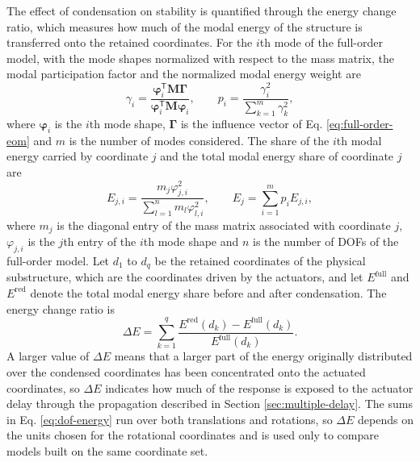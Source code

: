 \documentclass[11pt,a4paper]{article}
\numberwithin{equation}{section}
\begin{document}
The effect of condensation on stability is quantified through the energy change ratio, which measures how much of the modal energy of the structure is transferred onto the retained coordinates. For the \(i\)th mode of the full-order model, with the mode shapes normalized with respect to the mass matrix, the modal participation factor and the normalized modal energy weight are
\begin{equation}
	\gamma_{i}=
	\frac{\bm{\varphi}_{i}^{\mathsf{T}}\mathbf{M}\bm{\Gamma}}
	{\bm{\varphi}_{i}^{\mathsf{T}}\mathbf{M}\bm{\varphi}_{i}},
	\qquad
	p_{i}=\frac{\gamma_{i}^{2}}{\displaystyle\sum_{k=1}^{m}\gamma_{k}^{2}},
	\label{eq:modal-weight}
\end{equation}
where \(\bm{\varphi}_{i}\) is the \(i\)th mode shape, \(\bm{\Gamma}\) is the influence vector of Eq. \eqref{eq:full-order-eom} and \(m\) is the number of modes considered. The share of the \(i\)th modal energy carried by coordinate \(j\) and the total modal energy share of coordinate \(j\) are
\begin{equation}
	E_{j,i}=
	\frac{m_{j}\varphi_{j,i}^{2}}{\displaystyle\sum_{l=1}^{n}m_{l}\varphi_{l,i}^{2}},
	\qquad
	E_{j}=\sum_{i=1}^{m}p_{i}E_{j,i},
	\label{eq:dof-energy}
\end{equation}
where \(m_{j}\) is the diagonal entry of the mass matrix associated with coordinate \(j\), \(\varphi_{j,i}\) is the \(j\)th entry of the \(i\)th mode shape and \(n\) is the number of DOFs of the full-order model. Let \(d_{1}\) to \(d_{q}\) be the retained coordinates of the physical substructure, which are the coordinates driven by the actuators, and let \(E^{\mathrm{full}}\) and \(E^{\mathrm{red}}\) denote the total modal energy share before and after condensation. The energy change ratio is
\begin{equation}
	\Delta E=\sum_{k=1}^{q}
	\frac{E^{\mathrm{red}}(d_{k})-E^{\mathrm{full}}(d_{k})}{E^{\mathrm{full}}(d_{k})}.
	\label{eq:energy-change}
\end{equation}
A larger value of \(\Delta E\) means that a larger part of the energy originally distributed over the condensed coordinates has been concentrated onto the actuated coordinates, so \(\Delta E\) indicates how much of the response is exposed to the actuator delay through the propagation described in Section \ref{sec:multiple-delay}. The sums in Eq. \eqref{eq:dof-energy} run over both translations and rotations, so \(\Delta E\) depends on the units chosen for the rotational coordinates and is used only to compare models built on the same coordinate set.
\end{document}
